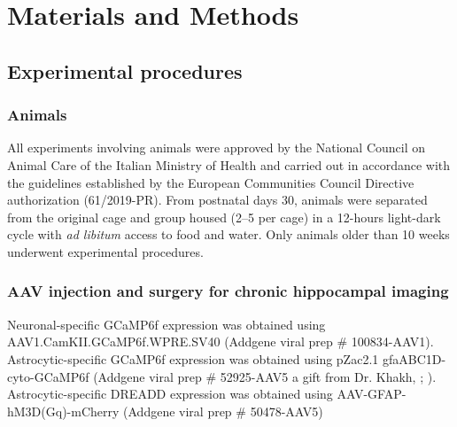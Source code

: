 
\chapter{Materials and Methods} %

\label{Chapter3} %

\section{Experimental procedures}
\label{chap3:sec:1:exp_proc}
\subsection{Animals}
All experiments involving animals were approved by the National Council on Animal Care of the Italian Ministry of Health and carried out in accordance with the guidelines established by the European Communities Council Directive authorization (61/2019-PR). 
From postnatal days 30, animals were separated from the original cage and group housed (2–5 per cage) in a 12-hours light-dark cycle with \textit{ad libitum} access to food and water. 
Only animals older than 10 weeks underwent experimental procedures. 

\subsection{AAV injection and surgery for chronic hippocampal imaging}
\label{chap3:sec:1:subsec2:AAV_injection}
Neuronal-specific GCaMP6f expression was obtained using AAV1.CamKII.GCaMP6f.WPRE.SV40 (Addgene viral prep \# 100834-AAV1).
Astrocytic-specific GCaMP6f expression was obtained using pZac2.1 gfaABC1D-cyto-GCaMP6f (Addgene viral prep \# 52925-AAV5 a gift from Dr. Khakh, \cite{haustein2014conditions}; \cite{srinivasan2015}).
Astrocytic-specific DREADD expression was obtained using AAV-GFAP-hM3D(Gq)-mCherry (Addgene viral prep \# 50478-AAV5)

